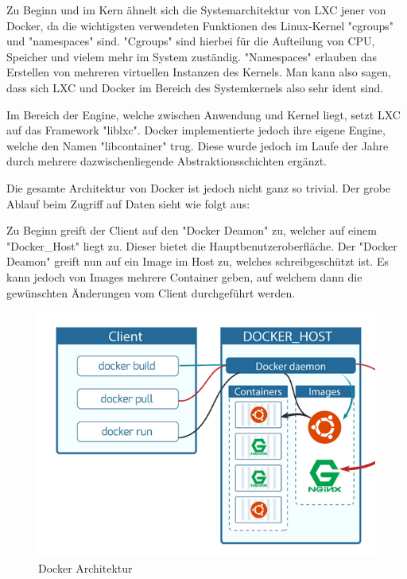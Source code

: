 

Zu Beginn und im Kern ähnelt sich die Systemarchitektur von LXC jener von Docker, da die wichtigsten verwendeten Funktionen des Linux-Kernel "cgroups" und "namespaces" sind. "Cgroups" sind hierbei für die Aufteilung von CPU, Speicher und vielem mehr im System zuständig. "Namespaces" erlauben das Erstellen von mehreren virtuellen Instanzen des Kernels. Man kann also sagen, dass sich LXC und Docker im Bereich des Systemkernels also sehr ident sind.

Im Bereich der Engine, welche zwischen Anwendung und Kernel liegt, setzt LXC auf das Framework "liblxc". Docker implementierte jedoch ihre eigene Engine, welche den Namen "libcontainer" trug. Diese wurde jedoch im Laufe der Jahre durch mehrere dazwischenliegende Abstraktionsschichten ergänzt.

Die gesamte Architektur von Docker ist jedoch nicht ganz so trivial. Der grobe Ablauf beim Zugriff auf Daten sieht wie folgt aus:

Zu Beginn greift der Client auf den "Docker Deamon" zu, welcher auf einem "Docker\_Host" liegt zu. Dieser bietet die Hauptbenutzeroberfläche. Der "Docker Deamon" greift nun auf ein Image im Host zu, welches schreibgeschützt ist. Es kann jedoch von Images mehrere Container geben, auf welchem dann die gewünschten Änderungen vom Client durchgeführt werden. \cite*{LxcVsDocker}

\begin{figure}[H]
    \centering
    \includegraphics{media/DockerAndContainering/DockerArchitektur.png}
    \caption{Docker Architektur \cite{LxcVsDocker}}
\end{figure}

